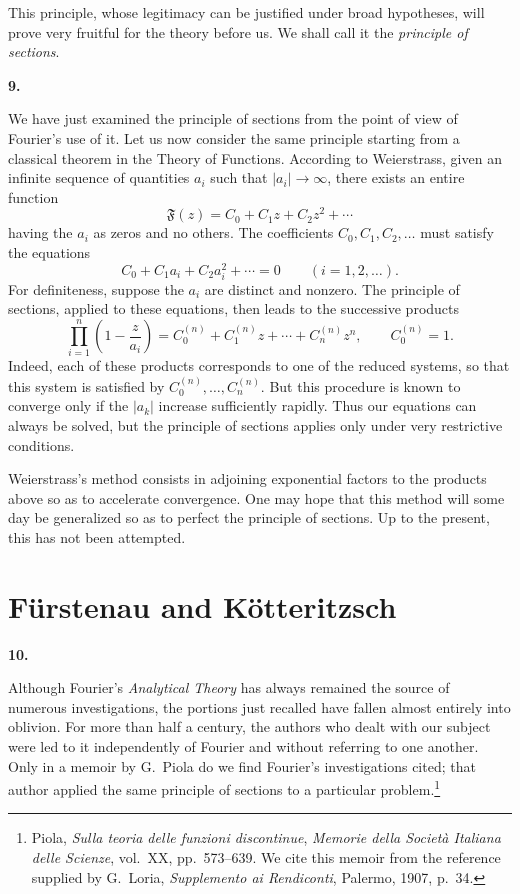 \documentclass[
  paper=b5,
  fontsize=13pt,
  twoside=true,
  open=any,
  bookmarkpackage=false,
  chapterprefix=true,
  headings=normal
]{scrbook}
\theoremstyle{definition}
\newcommand{\numberedparagraph}[1]{%
  \par\medskip\phantomsection\label{sec:#1}%
  \noindent\textbf{#1.}\enspace
}
\begin{document}
This principle, whose legitimacy can be justified under broad hypotheses, will prove very fruitful for the theory before us. We shall call it the \emph{principle of sections}.

\numberedparagraph{9}
We have just examined the principle of sections from the point of
view of Fourier's use of it. Let us now consider the same principle starting from a classical theorem in the Theory of Functions. According to Weierstrass, given an infinite sequence of quantities $a_i$ such that $|a_i|\to\infty$, there exists an entire function
\[
  \mathfrak F(z)=C_0+C_1z+C_2z^2+\cdots
\]
having the $a_i$ as zeros and no others. The coefficients $C_0,C_1,C_2,\ldots$ must satisfy the equations
\[
  C_0+C_1a_i+C_2a_i^2+\cdots=0\qquad(i=1,2,\ldots).
\]
For definiteness, suppose the $a_i$ are distinct and nonzero. The principle of sections, applied to these equations, then leads to the successive products
\[
  \prod_{i=1}^{n}\left(1-\frac z{a_i}\right)
  =C_0^{(n)}+C_1^{(n)}z+\cdots+C_n^{(n)}z^n,
  \qquad C_0^{(n)}=1.
\]
Indeed, each of these products corresponds to one of the reduced systems, so that this system is satisfied by $C_0^{(n)},\ldots,C_n^{(n)}$. But this procedure is known to converge only if the $|a_k|$ increase sufficiently rapidly. Thus our equations can always be solved, but the principle of sections applies only under very restrictive conditions.

Weierstrass's method consists in adjoining exponential factors to the products above so as to accelerate convergence. One may hope that this method will some day be generalized so as to perfect the principle of sections. Up to the present, this has not been attempted.

\section{F\"urstenau and K\"otteritzsch}

\numberedparagraph{10}
Although Fourier's \emph{Analytical Theory} has always remained the source of numerous investigations, the portions just recalled have fallen almost entirely into oblivion. For more than half a century, the authors who dealt with our subject were led to it independently of Fourier and without referring to one another. Only in a memoir by G.~Piola
do we find Fourier's investigations cited; that author applied the same principle of sections to a particular problem.\footnote{Piola, \emph{Sulla teoria delle funzioni discontinue}, \emph{Memorie della Societ\`a Italiana delle Scienze}, vol.~XX, pp.~573--639. We cite this memoir from the reference supplied by G.~Loria, \emph{Supplemento ai Rendiconti}, Palermo, 1907, p.~34.}
\end{document}
